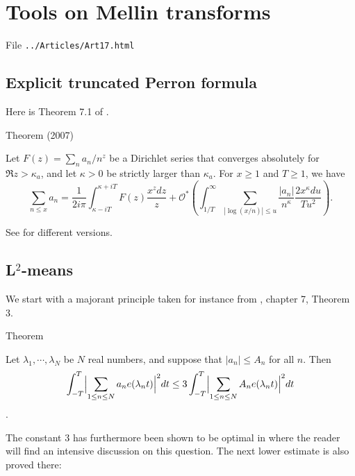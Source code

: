 \chapter{  Tools on Mellin transforms}

File \texttt{../Articles/Art17.html}










\section{Explicit truncated Perron formula
}



Here is Theorem 7.1 of
\cite{Ramare*07a}.


\begin{thm}{Theorem (2007)}

Let $F(z)=\sum_{n}a_n/n^z$ be a Dirichlet series that converges absolutely
  for $\Re z>\kappa_a$, and let $\kappa>0$ be strictly larger than 
  $\kappa_a$. For $x\ge1$ and $T\ge1$, we have
$$
    \sum_{n\le x}a_n
    =\frac1{2i\pi}\int_{\kappa-iT}^{\kappa+iT}F(z)\frac{x^zdz}z
    +\mathcal{O}^*\left(
      \int_{1/T}^{\infty}
      \sum_{|\log(x/n)|\le u}\frac{|a_n|}{n^\kappa}
      \frac{2x^\kappa du}{T u^2}
    \right).
$$
\end{thm}

See
\cite{Ramare*14-6}
for different versions.




\section{L${}^2$-means
}


We start with a majorant principle taken for instance from
\cite{Montgomery*94},
chapter 7, Theorem 3.

\begin{thm}{Theorem}

  Let $\lambda_1,\cdots,\lambda_N$ be $N$ real numbers, and suppose
  that $|a_n|\le A_n$ for all $n$. Then
  $$
  \int_{-T}^T\Bigl|\sum_{1\le n\le N}a_n e(\lambda_n t)\Bigr|^2dt
  \le 3
  \int_{-T}^T\Bigl|\sum_{1\le n\le N}A_n e(\lambda_n t)\Bigr|^2dt
  $$.
\end{thm}

The constant 3 has furthermore been shown to be optimal in
\cite{Logan*88}
where the reader will find an intensive discussion on this
question. The next lower estimate is also proved there:

